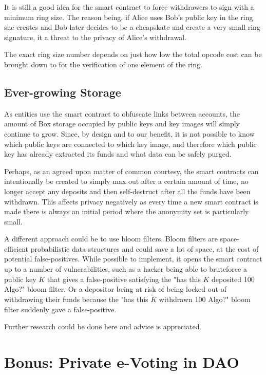 \documentclass[9pt]{article}
\begin{document}
It is still a good idea for the smart contract to force withdrawers to sign with a minimum ring size. The reason being, if Alice uses Bob's public key in the ring she creates and Bob later decides to be a cheapskate and create a very small ring signature, it a threat to the privacy of Alice's withdrawal.

The exact ring size number depends on just how low the total opcode cost can be brought down to for the verification of one element of the ring. 

\subsection{Ever-growing Storage}

As entities use the smart contract to obfuscate links between accounts, the amount of Box storage occupied by public keys and key images will simply continue to grow. Since, by design and to our benefit, it is not possible to know which public keys are connected to which key image, and therefore which public key has already extracted its funds and what data can be safely purged.

Perhaps, as an agreed upon matter of common courtesy, the smart contracts can intentionally be created to simply max out after a certain amount of time,  no longer accept any deposits and then self-destruct after all the funds have been withdrawn. This affects privacy negatively as every time a new smart contract is made there is always an initial period where the anonymity set is particularly small.

A different approach could be to use bloom filters. Bloom filters are space-efficient probabilistic data structures and could save a lot of space, at the cost of potential false-positives. While possible to implement, it opens the smart contract up to a number of vulnerabilities, such as a hacker being able to bruteforce a public key $K$ that gives a false-positive satisfying the "has this $K$ deposited 100 Algo?" bloom filter. Or a depositor being at risk of being locked out of withdrawing their funds because the "has this $\tilde{K}$ withdrawn 100 Algo?" bloom filter suddenly gave a false-positive.

Further research could be done here and advice is appreciated.


\section{Bonus: Private e-Voting in DAO}
\end{document}
